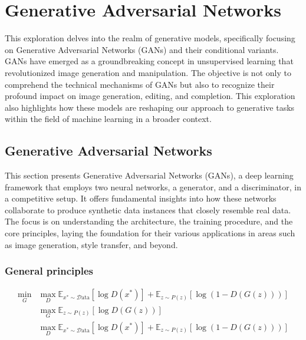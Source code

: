 \chapter{Generative Adversarial Networks}
\graphicspath{{figs/2de/}}

This exploration delves into the realm of generative models, specifically focusing on Generative Adversarial Networks (GANs) and their conditional variants. GANs have emerged as a groundbreaking concept in unsupervised learning that revolutionized image generation and manipulation. The objective is not only to comprehend the technical mechanisms of GANs but also to recognize their profound impact on image generation, editing, and completion. This exploration also highlights how these models are reshaping our approach to generative tasks within the field of machine learning in a broader context.

\section{Generative Adversarial Networks}

This section presents Generative Adversarial Networks (GANs), a deep learning framework that employs two neural networks, a generator, and a discriminator, in a competitive setup. It offers fundamental insights into how these networks collaborate to produce synthetic data instances that closely resemble real data. The focus is on understanding the architecture, the training procedure, and the core principles, laying the foundation for their various applications in areas such as image generation, style transfer, and beyond.

\subsection{General principles}

\begin{align}
    \min_{G} &\max_{D} \mathbb{E}_{x^* \sim \mathcal{D}\text{ata}} \left[ \log D(x^*) \right] + \mathbb{E}_{z \sim P(z)} \left[ \log (1 - D(G(z))) \right] \label{eq:minimax} \\
    &\max_{G} \mathbb{E}_{z \sim P(z)} \left[ \log D(G(z)) \right] \label{eq:G_maximization} \\
    &\max_{D} \mathbb{E}_{x^* \sim \mathcal{D}\text{ata}} \left[ \log D(x^*) \right] + \mathbb{E}_{z \sim P(z)} \left[ \log (1 - D(G(z))) \right] \label{eq:D_maximization}
\end{align}
    
